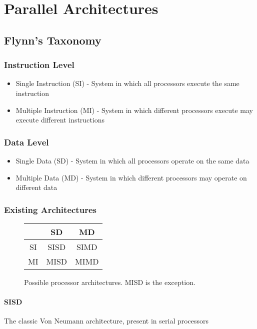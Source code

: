 \section{Parallel Architectures}

\subsection{Flynn's Taxonomy}

\subsubsection{Instruction Level}
\begin{itemize}
    \item Single Instruction (SI) - System in which all processors execute the same instruction
    \item Multiple Instruction (MI) - System in which different processors execute may execute different instructions
\end{itemize}

\subsubsection{Data Level}
\begin{itemize}
    \item Single Data (SD) - System in which all processors operate on the same data
    \item Multiple Data (MD) - System in which different processors may operate on different data
\end{itemize}

\subsubsection{Existing Architectures}

\begin{figure}[h]
    \centering
    \begin{tabular}{c | c | c}
           & SD   & MD   \\
        \hline
        SI & SISD & SIMD \\
        \hline
        MI & MISD & MIMD \\
    \end{tabular}
    \caption{Possible processor architectures. MISD is the exception.}
    \label{fig:flynn}
\end{figure}

\paragraph{SISD}
The classic Von Neumann architecture, present in serial processors



